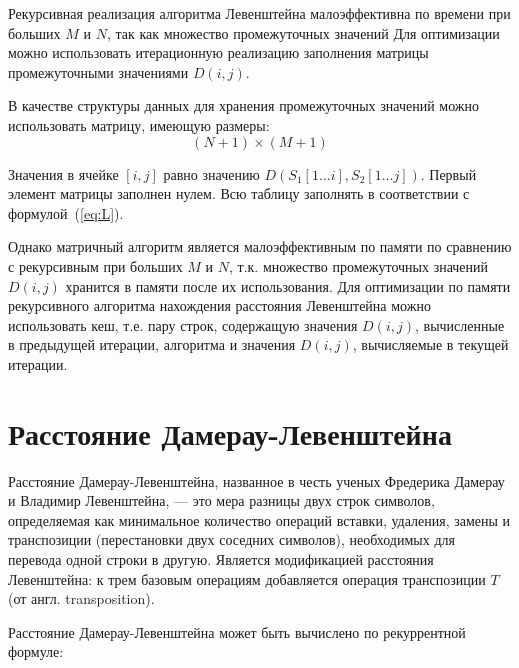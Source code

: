 Рекурсивная реализация алгоритма Левенштейна малоэффективна по времени при больших $M$ и $N$, так как множество промежуточных значений  Для оптимизации можно использовать итерационную реализацию заполнения матрицы промежуточными значениями $D(i,j)$.

В качестве структуры данных для хранения промежуточных значений можно использовать матрицу, имеющую размеры:
\begin{equation}
	\label{eq:lev-m-size}
	(N + 1) \times (M + 1)
\end{equation}

Значения в ячейке $[i, j]$ равно значению $D(S_{1}[1...i], S_{2}[1...j])$. Первый элемент матрицы заполнен нулем. Всю таблицу заполнять в соответствии с формулой~(\ref{eq:L}). 

Однако матричный алгоритм является малоэффективным по памяти по сравнению с рекурсивным при больших $M$ и $N$, т.к. множество промежуточных значений $D(i,j)$ хранится в памяти после их использования. Для оптимизации по памяти рекурсивного алгоритма нахождения расстояния Левенштейна можно использовать кеш, т.е. пару строк, содержащую значения $D(i,j)$, вычисленные в предыдущей итерации, алгоритма и значения $D(i,j)$, вычисляемые в текущей итерации.

\section{Расстояние Дамерау-Левенштейна}
Расстояние Дамерау-Левенштейна, названное в честь ученых Фредерика Дамерау и Владимир Левенштейна, --- это мера разницы двух строк символов, определяемая как минимальное количество операций вставки, удаления, замены и транспозиции (перестановки двух соседних символов), необходимых для перевода одной строки в другую. Является модификацией расстояния Левенштейна: к трем базовым операциям добавляется операция транспозиции $T$ (от англ. transposition).

Расстояние Дамерау-Левенштейна может быть вычислено по рекуррентной формуле:

